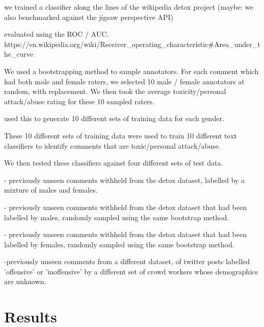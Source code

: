 \documentclass[sigconf]{acmart}
\begin{document}
we trained a classifier along the lines of the wikipedia detox project
(maybe: we also benchmarked against the jigsaw perspective API)

evaluated using the ROC / AUC.
https://en.wikipedia.org/wiki/Receiver_operating_characteristic#Area_under_the_curve

We used a bootstrapping method to sample annotators. For each comment which had both male and female raters, we selected 10 male / female annotators at random, with replacement. We then took the average toxicity/personal attack/abuse rating for these 10 sampled raters. 

used this to generate 10 different sets of training data for each gender.

These 10 different sets of training data were used to train 10 different text classifiers to identify comments that are toxic/personal attack/abuse.

We then tested these classifiers against four different sets of test data.

- previously unseen comments withheld from the detox dataset, labelled by a mixture of males and females.

- previously unseen comments withheld from the detox dataset that had been labelled by males, randomly sampled using the same bootstrap method.

- previously unseen comments withheld from the detox dataset that had been labelled by females, randomly sampled using the same bootstrap method.

-previously unseen comments from a different dataset, of twitter posts labelled 'offensive' or 'inoffensive' by a different set of crowd workers whose demographics are unknown.



\section{Results}
\end{document}
